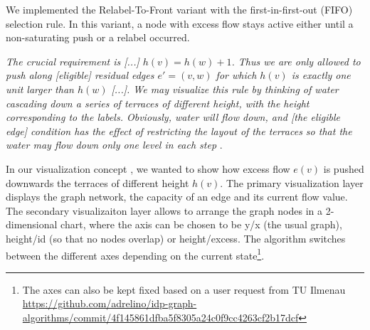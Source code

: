 We implemented the Relabel-To-Front variant with the first-in-first-out (FIFO) selection rule. In this variant, a node with excess flow stays active either until a non-saturating push or a relabel occurred. 


\textit{The crucial requirement is [...] $h(v) = h(w) + 1$. Thus we are only allowed to push along [eligible] residual edges $e'=(v,w)$ for which $h(v)$ is exactly one unit larger than $h(w)$ [...]. We may visualize this rule by thinking of water cascading down a series of terraces of different height, with the height corresponding to the labels. Obviously, water will flow down, and [the eligible edge] condition has the effect of restricting the layout of the terraces so that the water may flow down only one level in each step} \cite[sec. 6.6]{jungnickel2013graphs}.

In our visualization concept , we wanted to show how excess flow $e(v)$ is pushed downwards the terraces of different height $h(v)$. The primary visualization layer displays the graph network, the capacity of an edge and its current flow value. The secondary visualizaiton layer allows to arrange the graph nodes in a 2-dimensional chart, where the axis can be chosen to be y/x (the usual graph), height/id (so that no nodes overlap) or height/excess. The algorithm switches between the different axes depending on the current state\footnote{The axes can also be kept fixed based on a user request from TU Ilmenau \url{https://github.com/adrelino/idp-graph-algorithms/commit/4f145861dfba5f8305a24c0f9cc4263cf2b17dcf}}.

